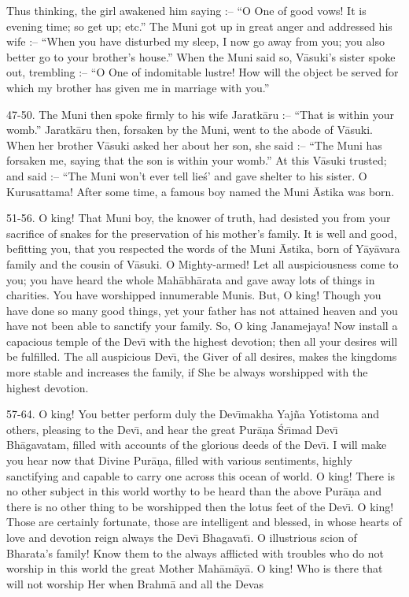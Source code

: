 Thus thinking, the girl awakened him saying :-- ``O One of good vows! It is evening time; so get up; etc.'' The Muni got up in great anger and addressed his wife :-- ``When you have disturbed my sleep, I now go away from you; you also better go to your brother's house.'' When the Muni said so, V\=asuki's sister spoke out, trembling :-- ``O One of indomitable lustre! How will the object be served for which my brother has given me in marriage with you.''

47-50. The Muni then spoke firmly to his wife Jaratk\=aru :-- ``That is within your womb.'' Jaratk\=aru then, forsaken by the Muni, went to the abode of V\=asuki. When her brother V\=asuki asked her about her son, she said :-- ``The Muni has forsaken me, saying that the son is within your womb.'' At this V\=asuki trusted; and said :-- ``The Muni won't ever tell lie\'s' and gave shelter to his sister. O Kurusattama! After some time, a famous boy named the Muni \=Astika was born.

51-56. O king! That Muni boy, the knower of truth, had desisted you from your sacrifice of snakes for the preservation of his mother's family. It is well and good, befitting you, that you respected the words of the Muni \=Astika, born of Y\=ay\=avara family and the cousin of V\=asuki. O Mighty-armed! Let all auspiciousness come to you; you have heard the whole Mah\=abh\=arata and gave away lots of things in charities. You have worshipped innumerable Munis. But, O king! Though you have done so many good things, yet your father has not attained heaven and you have not been able to sanctify your family. So, O king Janamejaya! Now install a capacious temple of the Dev\={\i} with the highest devotion; then all your desires will be fulfilled. The all auspicious Dev\={\i}, the Giver of all desires, makes the kingdoms more stable and increases the family, if She be always worshipped with the highest devotion.

57-64. O king! You better perform duly the Dev\={\i}makha Yaj\~na Yotistoma and others, pleasing to the Dev\={\i}, and hear the great Pur\=a\d{n}a \'Sr\={\i}mad Dev\={\i} Bh\=agavatam, filled with accounts of the glorious deeds of the Dev\={\i}. I will make you hear now that Divine Pur\=a\d{n}a, filled with various sentiments, highly sanctifying and capable to carry one across this ocean of world. O king! There is no other subject in this world worthy to be heard than the above Pur\=a\d{n}a and there is no other thing to be worshipped then the lotus feet of the Dev\={\i}. O king! Those are certainly fortunate, those are intelligent and blessed, in whose hearts of love and devotion reign always the Dev\={\i} Bhagavat\={\i}. O illustrious scion of Bharata's family! Know them to the always afflicted with troubles who do not worship in this world the great Mother Mah\=am\=ay\=a. O king! Who is there that will not worship Her when Brahm\=a and all the Devas

